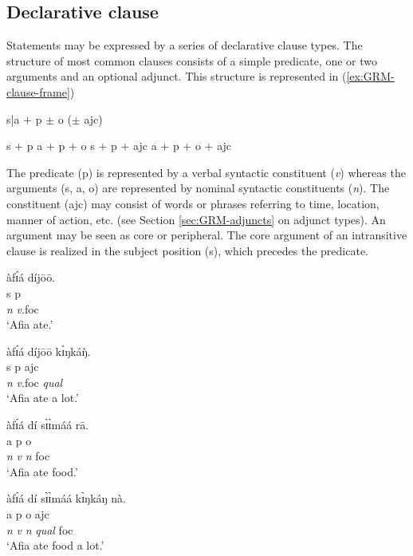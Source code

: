 \subsection{Declarative clause}
\label{sec:GRM-decl-clause}

Statements may be expressed by a series of declarative clause types. The structure of most common clauses consists of  a simple predicate, one or two arguments and an optional adjunct. This structure is represented in (\ref{ex:GRM-clause-frame})
 
\ea\label{ex:GRM-clause-frame}
{\rm  {\sc s|a}  $+$ {\sc p} $\pm$ {\sc o} ($\pm$ {\sc ajc}) }
\z


\ea\label{ex:GRM-cl-fr-inst}

\ea\label{ex:GRM-cl-fr-inst-s-p}
 {\sc s}  $+$ {\sc p} 
\ex\label{ex:GRM-cl-fr-inst-s-p-o}
 {\sc a}  $+$ {\sc p} $+$ {\sc o}
\ex\label{ex:GRM-cl-fr-inst-s-p-adj}
 {\sc s}  $+$ {\sc p}  $+$ {\sc ajc} 
 \ex\label{ex:GRM-cl-fr-inst-s-p-o-adj}
 {\sc a}  $+$ {\sc p} $+$ {\sc o} $+$ {\sc ajc} 

\z
\z

The predicate ({\sc p})  is represented by a verbal syntactic constituent ({\it v}) whereas  the arguments ({\sc s, a, o}) are represented by nominal syntactic constituents   ({\it n}).  The  constituent  ({\sc ajc}) may consist of words or phrases referring to time, location, manner of action, etc.  (see Section \ref{sec:GRM-adjuncts} on adjunct types).  An argument may be seen as core or peripheral.  The core argument of an intransitive clause is realized in the subject position ({\sc s}), which precedes the predicate. 


 \ea\label{ex:GRM-core}
\begin{multicols}{2}

\ea\label{ex:GRM-core-S-A-O}{
\glll àfɪ́á díjōō.\\
 {\sc s}  {\sc p}\\
{\it n} {\it v}.{\sc foc}\\
\glt `Afia ate.'
}

\ex\label{ex:GRM-core-S-O}{
\glll àfɪ́á díjōō kɪ̀ŋkáŋ̀.\\
 {\sc s}  {\sc p} {\sc ajc}\\
{\it n} {\it v}.{\sc foc}  {\it qual}\\
\glt `Afia ate a lot.'
}


\ex\label{ex:GRM-core-A-O}{
\glll àfɪ́á dí sɪ̀ɪ̀máá rā.\\
 {\sc a}  {\sc p}  {\sc o} {}\\
{\it n} {\it v} {\it n} {\sc foc}\\
\glt `Afia ate food.'
}

\ex\label{ex:GRM-core-A-O1}{
\glll àfɪ́á dí sɪ̀ɪ̀máá  kɪ̀ŋkáŋ nà.\\
 {\sc a}  {\sc p}  {\sc o}  {\sc ajc}  {}\\
{\it n} {\it v} {\it n}  {\it qual} {\sc foc}\\
\glt `Afia ate food a lot.'
}

\z 
\end{multicols}
 \z


